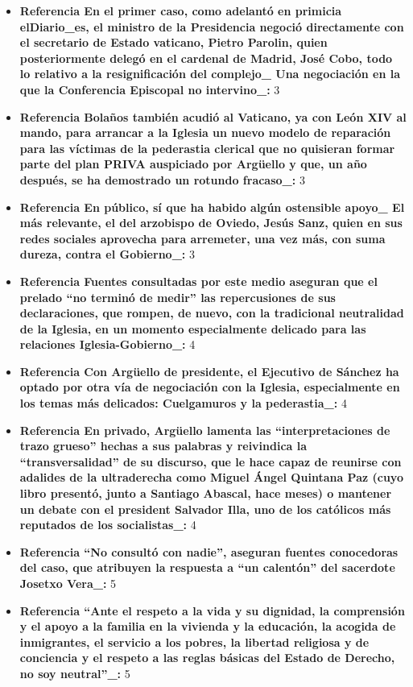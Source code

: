 \documentclass[10pt,a4paper]{article}
\begin{document}
\begin{itemize}[leftmargin=*]
            \item \textbf{Referencia En el primer caso, como adelant\'{o} en primicia elDiario\_es, el ministro de la Presidencia negoci\'{o} directamente con el secretario de Estado vaticano, Pietro Parolin, quien posteriormente deleg\'{o} en el cardenal de Madrid, Jos\'{e} Cobo, todo lo relativo a la resignificaci\'{o}n del complejo\_ Una negociaci\'{o}n en la que la Conferencia Episcopal no intervino\_:} 3
            \item \textbf{Referencia Bola\~{n}os tambi\'{e}n acudi\'{o} al Vaticano, ya con Le\'{o}n XIV al mando, para arrancar a la Iglesia un nuevo modelo de reparaci\'{o}n para las v\'{i}ctimas de la pederastia clerical que no quisieran formar parte del plan PRIVA auspiciado por Arg\"{u}ello y que, un a\~{n}o despu\'{e}s, se ha demostrado un rotundo fracaso\_:} 3
            \item \textbf{Referencia En p\'{u}blico, s\'{i} que ha habido alg\'{u}n ostensible apoyo\_ El m\'{a}s relevante, el del arzobispo de Oviedo, Jes\'{u}s Sanz, quien en sus redes sociales aprovecha para arremeter, una vez m\'{a}s, con suma dureza, contra el Gobierno\_:} 3
            \item \textbf{Referencia Fuentes consultadas por este medio aseguran que el prelado ``no termin\'{o} de medir'' las repercusiones de sus declaraciones, que rompen, de nuevo, con la tradicional neutralidad de la Iglesia, en un momento especialmente delicado para las relaciones Iglesia-Gobierno\_:} 4
            \item \textbf{Referencia Con Arg\"{u}ello de presidente, el Ejecutivo de S\'{a}nchez ha optado por otra v\'{i}a de negociaci\'{o}n con la Iglesia, especialmente en los temas m\'{a}s delicados: Cuelgamuros y la pederastia\_:} 4
            \item \textbf{Referencia En privado, Arg\"{u}ello lamenta las ``interpretaciones de trazo grueso'' hechas a sus palabras y reivindica la ``transversalidad'' de su discurso, que le hace capaz de reunirse con adalides de la ultraderecha como Miguel \'{A}ngel Quintana Paz (cuyo libro present\'{o}, junto a Santiago Abascal, hace meses) o mantener un debate con el president Salvador Illa, uno de los cat\'{o}licos m\'{a}s reputados de los socialistas\_:} 4
            \item \textbf{Referencia ``No consult\'{o} con nadie'', aseguran fuentes conocedoras del caso, que atribuyen la respuesta a ``un calent\'{o}n'' del sacerdote Josetxo Vera\_:} 5
            \item \textbf{Referencia ``Ante el respeto a la vida y su dignidad, la comprensi\'{o}n y el apoyo a la familia en la vivienda y la educaci\'{o}n, la acogida de inmigrantes, el servicio a los pobres, la libertad religiosa y de conciencia y el respeto a las reglas b\'{a}sicas del Estado de Derecho, no soy neutral''\_:} 5
    \end{itemize}
\vspace{1em}
\end{document}
